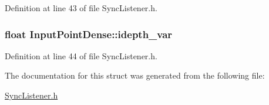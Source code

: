 \-Definition at line 43 of file \-Sync\-Listener.\-h.

\hypertarget{structInputPointDense_adb860b5e78f47b2d7e073559e725dda4}{
\subsubsection[{idepth\-\_\-var}]{\setlength{\rightskip}{0pt plus 5cm}float {\bf \-Input\-Point\-Dense\-::idepth\-\_\-var}}}\label{structInputPointDense_adb860b5e78f47b2d7e073559e725dda4}


\-Definition at line 44 of file \-Sync\-Listener.\-h.



\-The documentation for this struct was generated from the following file\-:\begin{DoxyCompactItemize}
\item 
\hyperlink{SyncListener_8h}{\-Sync\-Listener.\-h}\end{DoxyCompactItemize}

